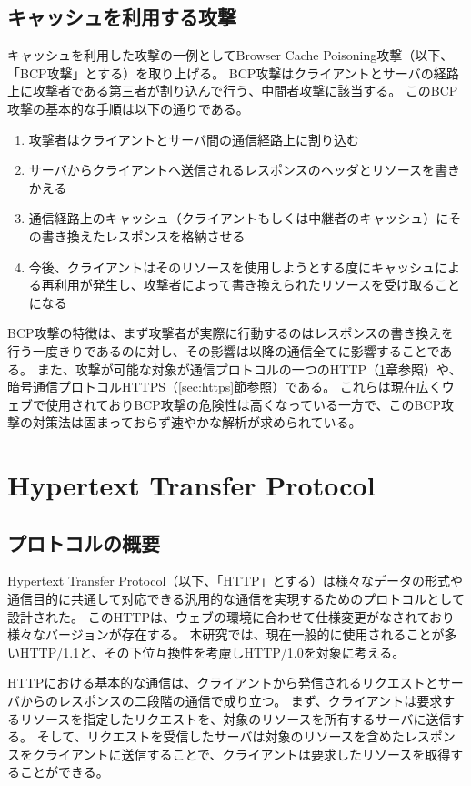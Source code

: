 \documentclass[12pt,a4paper]{jbook}
\begin{document}
\subsection{キャッシュを利用する攻撃}
キャッシュを利用した攻撃の一例としてBrowser Cache Poisoning攻撃（以下、「BCP攻撃」とする）\cite{bcpattack}を取り上げる。
BCP攻撃はクライアントとサーバの経路上に攻撃者である第三者が割り込んで行う、中間者攻撃に該当する。
このBCP攻撃の基本的な手順は以下の通りである。
\begin{enumerate}
\item 攻撃者はクライアントとサーバ間の通信経路上に割り込む
\item サーバからクライアントへ送信されるレスポンスのヘッダとリソースを書きかえる
\item 通信経路上のキャッシュ（クライアントもしくは中継者のキャッシュ）にその書き換えたレスポンスを格納させる
\item 今後、クライアントはそのリソースを使用しようとする度にキャッシュによる再利用が発生し、攻撃者によって書き換えられたリソースを受け取ることになる
\end{enumerate}

BCP攻撃の特徴は、まず攻撃者が実際に行動するのはレスポンスの書き換えを行う一度きりであるのに対し、その影響は以降の通信全てに影響することである。
また、攻撃が可能な対象が通信プロトコルの一つのHTTP（\ref{sec:http}章参照）や、暗号通信プロトコルHTTPS（\ref{sec:https}節参照）である。
これらは現在広くウェブで使用されておりBCP攻撃の危険性は高くなっている一方で、このBCP攻撃の対策法は固まっておらず速やかな解析が求められている。

\section{Hypertext Transfer Protocol}
\label{sec:http}
\subsection{プロトコルの概要}
Hypertext Transfer Protocol（以下、「HTTP」とする）は様々なデータの形式や通信目的に共通して対応できる汎用的な通信を実現するためのプロトコルとして設計された。
このHTTPは、ウェブの環境に合わせて仕様変更がなされており様々なバージョンが存在する。
本研究では、現在一般的に使用されることが多いHTTP/1.1\cite{rfc7230,rfc7231,rfc7232,rfc7233,rfc7234,rfc7235}と、その下位互換性を考慮しHTTP/1.0\cite{rfc1945}を対象に考える。

HTTPにおける基本的な通信は、クライアントから発信されるリクエストとサーバからのレスポンスの二段階の通信で成り立つ。
まず、クライアントは要求するリソースを指定したリクエストを、対象のリソースを所有するサーバに送信する。
そして、リクエストを受信したサーバは対象のリソースを含めたレスポンスをクライアントに送信することで、クライアントは要求したリソースを取得することができる。
\end{document}
